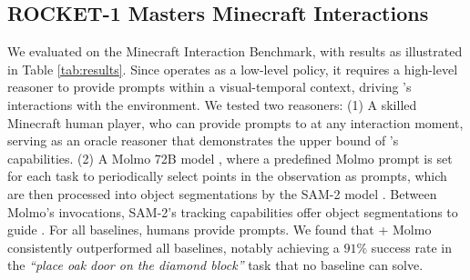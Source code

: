 \documentclass[11pt, a4paper, logo, two column]{craftjarvis}
\begin{document}
\subsection{ROCKET-1 Masters Minecraft Interactions }
We evaluated \agent on the Minecraft Interaction Benchmark, with results as illustrated in Table \ref{tab:results}. Since \agent operates as a low-level policy, it requires a high-level reasoner to provide prompts within a visual-temporal context, driving \agent’s interactions with the environment. We tested two reasoners: (1) A skilled Minecraft human player, who can provide prompts to \agent at any interaction moment, serving as an oracle reasoner that demonstrates the upper bound of \agent’s capabilities. (2) A Molmo 72B model \citep{molmo}, where a predefined Molmo prompt is set for each task to periodically select points in the observation as prompts, which are then processed into object segmentations by the SAM-2 model \citep{sam2}. Between Molmo’s invocations, SAM-2’s tracking capabilities offer object segmentations to guide \agent. For all baselines, humans provide prompts. We found that \agent + Molmo consistently outperformed all baselines, notably achieving a $91\%$ success rate in the \textit{``place oak door on the diamond block''} task that no baseline can solve. 
\end{document}
